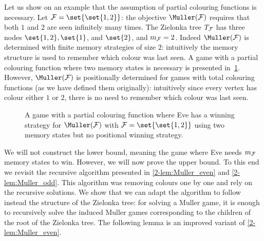 Let us show on an example that the assumption of partial colouring functions is necessary.
Let $\F = \set{ \set{1,2} }$: the objective $\Muller(\F)$ requires that both $1$ and $2$ are seen infinitely many times.
The Zielonka tree $T_{\mathcal{F}}$ has three nodes $\set{1,2}, \set{1}$, and $\set{2}$, and $m_{\mathcal{F}} = 2$.
Indeed $\Muller(\F)$ is determined with finite memory strategies of size $2$:
intuitively the memory structure is used to remember which colour was last seen.
A game with a partial colouring function where two memory states is necessary is presented in~\cref{2-fig:lower_bound_zielonka}.
However, $\Muller(\F)$ is positionally determined for games with total colouring functions (as we have defined them originally):
intuitively since every vertex has colour either $1$ or $2$, there is no need to remember which colour was last seen.

\begin{figure}
\centering
\caption{A game with a partial colouring function 
where Eve has a winning strategy for $\Muller(\F)$ with $\F = \set{ \set{1,2} }$ using two memory states
but no positional winning strategy.}
\label{2-fig:lower_bound_zielonka}
\end{figure}




We will not construct the lower bound, meaning the game where Eve needs $m_{\mathcal{F}}$ memory states to win.
However, we will now prove the upper bound.
To this end we revisit the recursive algorithm presented in \cref{2-lem:Muller_even} and \cref{2-lem:Muller_odd}.
This algorithm was removing colours one by one and rely on the recursive solutions.
We show that we can adapt the algorithm to follow instead the structure of the Zielonka tree: 
for solving a Muller game, it is enough to recursively solve the induced Muller games
corresponding to the children of the root of the Zielonka tree.
The following lemma is an improved variant of \cref{2-lem:Muller_even}.

